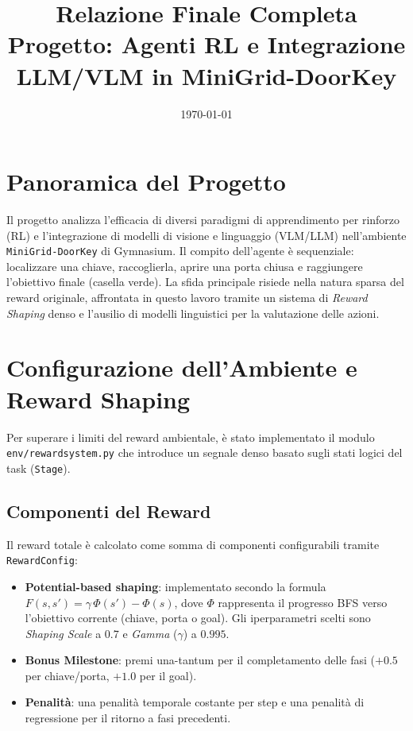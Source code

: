\documentclass[12pt,a4paper]{article}
\title{\textbf{Relazione Finale Completa}\\[0.4em]
       \large Progetto: Agenti RL e Integrazione LLM/VLM in MiniGrid-DoorKey}
\author{}
\date{\today}
\begin{document}
\maketitle
\tableofcontents
\bigskip

\section{Panoramica del Progetto}
Il progetto analizza l'efficacia di diversi paradigmi di apprendimento per rinforzo (RL) e l'integrazione di modelli di visione e linguaggio (VLM/LLM) nell'ambiente \texttt{MiniGrid-DoorKey} di Gymnasium. Il compito dell'agente è sequenziale: localizzare una chiave, raccoglierla, aprire una porta chiusa e raggiungere l'obiettivo finale (casella verde). La sfida principale risiede nella natura sparsa del reward originale, affrontata in questo lavoro tramite un sistema di \textit{Reward Shaping} denso e l'ausilio di modelli linguistici per la valutazione delle azioni.

\section{Configurazione dell'Ambiente e Reward Shaping}
Per superare i limiti del reward ambientale, è stato implementato il modulo \texttt{env/rewardsystem.py} che introduce un segnale denso basato sugli stati logici del task (\texttt{Stage}).

\subsection{Componenti del Reward}
Il reward totale è calcolato come somma di componenti configurabili tramite \texttt{RewardConfig}:
\begin{itemize}
    \item \textbf{Potential-based shaping}: implementato secondo la formula $F(s,s') = \gamma\,\Phi(s') - \Phi(s)$, dove $\Phi$ rappresenta il progresso BFS verso l'obiettivo corrente (chiave, porta o goal). Gli iperparametri scelti sono \textit{Shaping Scale} a $0.7$ e \textit{Gamma} ($\gamma$) a $0.995$.
    \item \textbf{Bonus Milestone}: premi una-tantum per il completamento delle fasi ($+0.5$ per chiave/porta, $+1.0$ per il goal).
    \item \textbf{Penalità}: una penalità temporale costante per step e una penalità di regressione per il ritorno a fasi precedenti.
\end{itemize}
\end{document}
